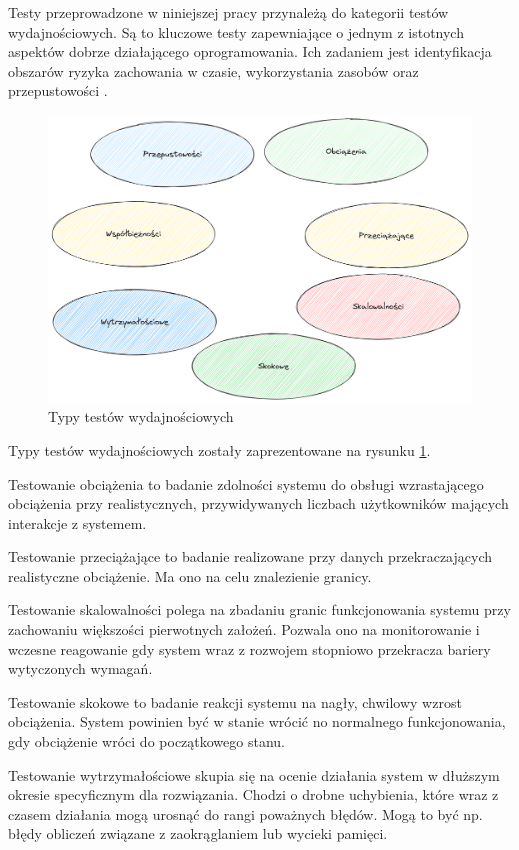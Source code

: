 Testy przeprowadzone w niniejszej pracy przynależą do kategorii testów wydajnościowych.
Są to kluczowe testy zapewniające o jednym z istotnych aspektów dobrze działającego oprogramowania.
Ich zadaniem jest identyfikacja obszarów ryzyka zachowania w czasie, wykorzystania zasobów oraz przepustowości \cite{testerzyTestowanieWydajnoci}.

\begin{figure}[!hb]
	\centering \includegraphics[width=1\linewidth]{rysunki/performance-tests.png}
	\caption{Typy testów wydajnościowych}
	\label{rys:performance-tests}
\end{figure}

Typy testów wydajnościowych zostały zaprezentowane na rysunku \ref{rys:performance-tests}.

Testowanie obciążenia to badanie zdolności systemu do obsługi wzrastającego obciążenia przy realistycznych, przywidywanych liczbach użytkowników mających interakcje z systemem.

Testowanie przeciążające to badanie realizowane przy danych przekraczających realistyczne obciążenie. 
Ma ono na celu znalezienie granicy.

Testowanie skalowalności polega na zbadaniu granic funkcjonowania systemu przy zachowaniu większości pierwotnych założeń.
Pozwala ono na monitorowanie i wczesne reagowanie gdy system wraz z rozwojem stopniowo przekracza bariery wytyczonych wymagań.

Testowanie skokowe to badanie reakcji systemu na nagły, chwilowy wzrost obciążenia.
System powinien być w stanie wrócić no normalnego funkcjonowania, gdy obciążenie wróci do początkowego stanu.

Testowanie wytrzymałościowe skupia się na ocenie działania system w dłuższym okresie specyficznym dla rozwiązania.
Chodzi o drobne uchybienia, które wraz z czasem działania mogą urosnąć do rangi poważnych błędów.
Mogą to być np. błędy obliczeń związane z zaokrąglaniem lub wycieki pamięci.


